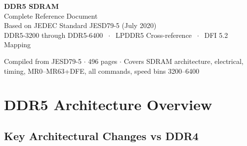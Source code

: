 \documentclass[10pt,a4paper,twoside]{article}
\begin{document}
\begin{titlepage}
\pagecolor{navyblue}
\color{white}
\vspace*{3cm}
\begin{center}
{\fontsize{36}{44}\selectfont\bfseries DDR5 SDRAM}\\[8pt]
{\fontsize{20}{28}\selectfont Complete Reference Document}\\[16pt]
{\large\color{amber} Based on JEDEC Standard JESD79-5 (July 2020)}\\[8pt]
{\normalsize DDR5-3200 through DDR5-6400 $\;\cdot\;$ LPDDR5 Cross-reference
$\;\cdot\;$ DFI 5.2 Mapping}
\vfill
{}
\vfill
{\small\color{midgray} Compiled from JESD79-5 $\cdot$ 496 pages $\cdot$
Covers SDRAM architecture, electrical, timing, MR0--MR63+DFE, all commands,
speed bins 3200--6400}
\end{center}
\end{titlepage}
\pagecolor{white}\color{black}

\tableofcontents
\clearpage

\section{DDR5 Architecture Overview}

\subsection{Key Architectural Changes vs DDR4}
\end{document}
